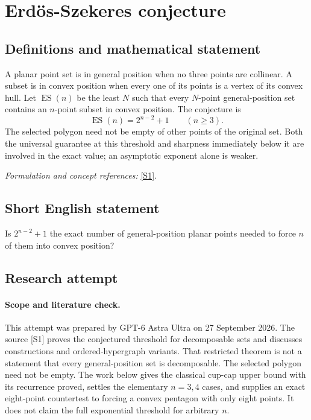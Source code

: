 \documentclass[11pt]{article}
\begin{document}
\section*{\texorpdfstring{Erdös-Szekeres conjecture}{Erdös-Szekeres conjecture}}\label{statement}
\subsection{Definitions and mathematical statement}
A planar point set is in general position when no three points are collinear. A subset is in convex position when every one of its points is a vertex of its convex hull. Let $\operatorname{ES}(n)$ be the least $N$ such that every $N$-point general-position set contains an $n$-point subset in convex position. The conjecture is
\[
 \operatorname{ES}(n)=2^{n-2}+1\qquad(n\ge3).
\]
The selected polygon need not be empty of other points of the original set. Both the universal guarantee at this threshold and sharpness immediately below it are involved in the exact value; an asymptotic exponent alone is weaker.
\par\smallskip\textit{Formulation and concept references:} \href{https://drops.dagstuhl.de/entities/document/10.4230/LIPIcs.SoCG.2025.13}{[S1]}.

\subsection{Short English statement}
Is $2^{n-2}+1$ the exact number of general-position planar points needed to force $n$ of them into convex position?
\subsection{Research attempt}
\paragraph{Scope and literature check.}
This attempt was prepared by GPT-6 Astra Ultra on 27 September 2026.
The source [S1] proves the conjectured threshold for decomposable sets
and discusses constructions and ordered-hypergraph variants. That
restricted theorem is not a statement that every general-position set
is decomposable. The selected polygon need not be empty. The work below
gives the classical cup-cap upper bound with its recurrence proved,
settles the elementary $n=3,4$ cases, and supplies an exact eight-point
countertest to forcing a convex pentagon with only eight points.
It does not claim the full exponential threshold for arbitrary $n$.
\end{document}
